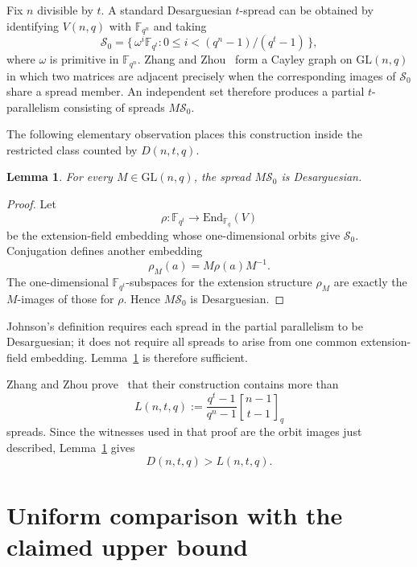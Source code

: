 \documentclass[11pt]{article}
\newtheorem{lemma}[theorem]{Lemma}
\newcommand{\F}{\mathbb F}
\newcommand{\qbinom}[2]{\genfrac{[}{]}{0pt}{}{#1}{#2}_{q}}
\begin{document}
Fix $n$ divisible by $t$. A standard Desarguesian $t$-spread can be obtained
by identifying $V(n,q)$ with $\F_{q^n}$ and taking
\begin{equation}
\mathcal S_0=
\{\,\omega^i\F_{q^t}:
0\leq i<(q^n-1)/(q^t-1)\,\},
\label{eq:standard-spread}
\end{equation}
where $\omega$ is primitive in $\F_{q^n}$. Zhang and
Zhou~\cite[Theorem~3.1]{ZhangZhou} form a Cayley graph on
$\mathrm{GL}(n,q)$ in which two matrices are adjacent precisely when the
corresponding images of $\mathcal S_0$ share a spread member. An independent
set therefore produces a partial $t$-parallelism consisting of spreads
$M\mathcal S_0$.

The following elementary observation places this construction inside the
restricted class counted by $D(n,t,q)$.

\begin{lemma}\label{lem:orbit-desarguesian}
For every $M\in\mathrm{GL}(n,q)$, the spread $M\mathcal S_0$ is
Desarguesian.
\end{lemma}

\begin{proof}
Let
\[
\rho:\F_{q^t}\longrightarrow
\mathrm{End}_{\F_q}(V)
\]
be the extension-field embedding whose one-dimensional orbits give
$\mathcal S_0$. Conjugation defines another embedding
\[
\rho_M(a)=M\rho(a)M^{-1}.
\]
The one-dimensional $\F_{q^t}$-subspaces for the extension structure
$\rho_M$ are exactly the $M$-images of those for $\rho$. Hence
$M\mathcal S_0$ is Desarguesian.
\end{proof}

Johnson's definition requires each spread in the partial parallelism to be
Desarguesian; it does not require all spreads to arise from one common
extension-field embedding. Lemma~\ref{lem:orbit-desarguesian} is therefore
sufficient.

Zhang and Zhou prove~\cite[Corollary~3.4]{ZhangZhou} that their construction
contains more than
\begin{equation}
L(n,t,q):=
\frac{q^t-1}{q^n-1}\qbinom{n-1}{t-1}
\label{eq:L}
\end{equation}
spreads. Since the witnesses used in that proof are the orbit images just
described, Lemma~\ref{lem:orbit-desarguesian} gives
\begin{equation}
D(n,t,q)>L(n,t,q).
\label{eq:DgtL}
\end{equation}

\section{Uniform comparison with the claimed upper bound}
\label{sec:comparison}
\end{document}
